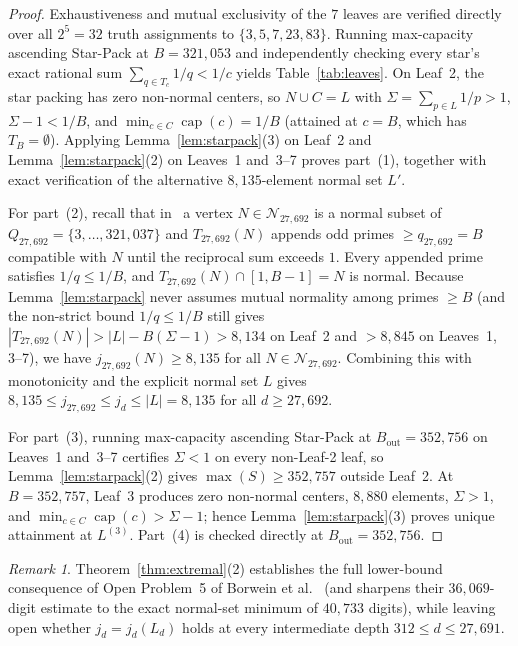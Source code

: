 \documentclass[11pt]{article}
\theoremstyle{remark}
\newtheorem{remark}[theorem]{Remark}
\newcommand{\capf}{\operatorname{cap}}
\begin{document}
\begin{proof}
Exhaustiveness and mutual exclusivity of the $7$ leaves are verified directly
over all $2^5 = 32$ truth assignments to $\{3,5,7,23,83\}$. Running max-capacity
ascending Star-Pack at $B = 321{,}053$ and independently checking every star's
exact rational sum $\sum_{q\in T_c} 1/q < 1/c$ yields Table~\ref{tab:leaves}. On
Leaf~2, the star packing has zero non-normal centers, so $N \cup C = L$ with
$\Sigma = \sum_{p\in L} 1/p > 1$, $\Sigma - 1 < 1/B$, and
$\min_{c\in C}\capf(c) = 1/B$ (attained at $c = B$, which has $T_B = \emptyset$).
Applying Lemma~\ref{lem:starpack}(3) on Leaf~2 and Lemma~\ref{lem:starpack}(2)
on Leaves~1 and~3--7 proves part~(1), together with exact verification of the
alternative $8{,}135$-element normal set $L'$.

For part~(2), recall that in~\cite{DBLP:journals/int/BorweinMS13} a vertex
$N \in \mathcal{N}_{27,692}$ is a normal subset of $Q_{27,692} = \{3,\dots,321{,}037\}$
and $T_{27,692}(N)$ appends odd primes $\ge q_{27,692} = B$ compatible with $N$
until the reciprocal sum exceeds $1$. Every appended prime satisfies $1/q \le 1/B$,
and $T_{27,692}(N) \cap [1, B - 1] = N$ is normal. Because
Lemma~\ref{lem:starpack} never assumes mutual normality among primes $\ge B$
(and the non-strict bound $1/q \le 1/B$ still gives
$|T_{27,692}(N)| > |L| - B(\Sigma - 1) > 8{,}134$ on Leaf~2 and $>8{,}845$ on
Leaves~1, 3--7), we have $j_{27,692}(N) \ge 8{,}135$ for all
$N \in \mathcal{N}_{27,692}$. Combining this with monotonicity
\cite[Theorem~10]{DBLP:journals/int/BorweinMS13} and the explicit normal set $L$
gives $8{,}135 \le j_{27,692} \le j_d \le |L| = 8{,}135$ for all $d \ge 27{,}692$.

For part~(3), running max-capacity ascending Star-Pack at $B_{\mathrm{out}} = 352{,}756$
on Leaves~1 and~3--7 certifies $\Sigma < 1$ on every non-Leaf-2 leaf, so
Lemma~\ref{lem:starpack}(2) gives $\max(S) \ge 352{,}757$ outside Leaf~2. At
$B = 352{,}757$, Leaf~3 produces zero non-normal centers, $8{,}880$ elements,
$\Sigma > 1$, and $\min_{c\in C}\capf(c) > \Sigma - 1$; hence
Lemma~\ref{lem:starpack}(3) proves unique attainment at $L^{(3)}$. Part~(4) is
checked directly at $B_{\mathrm{out}} = 352{,}756$.
\end{proof}

\begin{remark}\label{rem:open5}
Theorem~\ref{thm:extremal}(2) establishes the full lower-bound consequence of
Open Problem~5 of Borwein et al.~\cite{Borwein_1996} (and sharpens their
$36{,}069$-digit estimate to the exact normal-set minimum of $40{,}733$ digits),
while leaving open whether $j_d = j_d(L_d)$ holds at every intermediate depth
$312 \le d \le 27{,}691$.
\end{remark}
\end{document}
